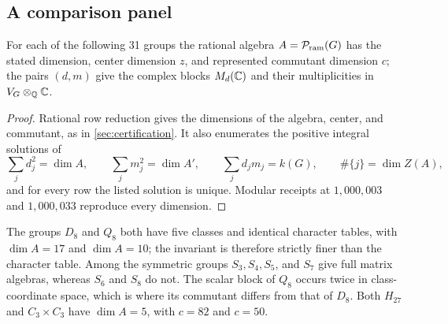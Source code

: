 \subsection{A comparison panel}
\label{sec:census}

\begin{theorem}
\label{thm:comparison-panel}
For each of the following 31 groups the rational algebra
\(A=\mathcal P_{\mathrm{ram}}(G)\) has the stated dimension, center dimension \(z\), and
represented commutant dimension \(c\); the pairs \((d,m)\) give the complex
blocks \(M_d(\mathbb C)\) and their multiplicities in \(V_G\otimes_\mathbb Q\mathbb C\).


\end{theorem}

\begin{proof}
Rational row reduction gives the dimensions of the algebra, center, and
commutant, as in \cref{sec:certification}.  It also enumerates the positive
integral solutions of
\begin{equation}
 \sum_j d_j^2=\dim A,\qquad
 \sum_j m_j^2=\dim A',\qquad
 \sum_jd_jm_j=k(G),\qquad
 \#\{j\}=\dim Z(A),
 \label{eq:dimension-system}
\end{equation}
and for every row the listed solution is unique.  Modular receipts at
\(1{,}000{,}003\) and \(1{,}000{,}033\) reproduce every dimension.
\end{proof}

The groups \(D_8\) and \(Q_8\) both have five classes and identical character
tables, with \(\dim A=17\) and \(\dim A=10\); the invariant is therefore
strictly finer than the character table.  Among the symmetric groups
\(S_3,S_4,S_5\), and \(S_7\) give full matrix algebras, whereas \(S_6\) and
\(S_8\) do not.  The scalar block of \(Q_8\) occurs twice in
class-coordinate space, which is where its commutant differs from that of
\(D_8\).  Both \(H_{27}\) and \(C_3\times C_3\) have \(\dim A=5\), with
\(c=82\) and \(c=50\).
